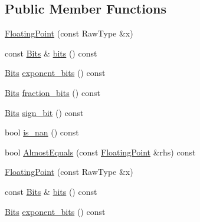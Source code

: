 \subsection*{Public Member Functions}
\begin{DoxyCompactItemize}
\item 
\hyperlink{classtesting_1_1internal_1_1_floating_point_a0dabf840863e0df84046f171c891fe71}{Floating\-Point} (const Raw\-Type \&x)
\item 
const \hyperlink{classtesting_1_1internal_1_1_floating_point_abf228bf6cd48f12c8b44c85b4971a731}{Bits} \& \hyperlink{classtesting_1_1internal_1_1_floating_point_abead51f16ec6ea84360a976da1cd1387}{bits} () const 
\item 
\hyperlink{classtesting_1_1internal_1_1_floating_point_abf228bf6cd48f12c8b44c85b4971a731}{Bits} \hyperlink{classtesting_1_1internal_1_1_floating_point_af53c50b85408c582540d6244c026ce2b}{exponent\-\_\-bits} () const 
\item 
\hyperlink{classtesting_1_1internal_1_1_floating_point_abf228bf6cd48f12c8b44c85b4971a731}{Bits} \hyperlink{classtesting_1_1internal_1_1_floating_point_aa0167b7b10a934b743ba3c1f47421e63}{fraction\-\_\-bits} () const 
\item 
\hyperlink{classtesting_1_1internal_1_1_floating_point_abf228bf6cd48f12c8b44c85b4971a731}{Bits} \hyperlink{classtesting_1_1internal_1_1_floating_point_a6176cc4d443724477f2799bcbd9f020a}{sign\-\_\-bit} () const 
\item 
bool \hyperlink{classtesting_1_1internal_1_1_floating_point_aaef2fd2cd8cdf791206a5e9fed8ef90d}{is\-\_\-nan} () const 
\item 
bool \hyperlink{classtesting_1_1internal_1_1_floating_point_adb0fe9ab1d9e5288f8e5550234211166}{Almost\-Equals} (const \hyperlink{classtesting_1_1internal_1_1_floating_point}{Floating\-Point} \&rhs) const 
\item 
\hyperlink{classtesting_1_1internal_1_1_floating_point_a0dabf840863e0df84046f171c891fe71}{Floating\-Point} (const Raw\-Type \&x)
\item 
const \hyperlink{classtesting_1_1internal_1_1_floating_point_abf228bf6cd48f12c8b44c85b4971a731}{Bits} \& \hyperlink{classtesting_1_1internal_1_1_floating_point_abead51f16ec6ea84360a976da1cd1387}{bits} () const 
\item 
\hyperlink{classtesting_1_1internal_1_1_floating_point_abf228bf6cd48f12c8b44c85b4971a731}{Bits} \hyperlink{classtesting_1_1internal_1_1_floating_point_af53c50b85408c582540d6244c026ce2b}{exponent\-\_\-bits} () const 
\item 

\end{DoxyCompactItemize}
